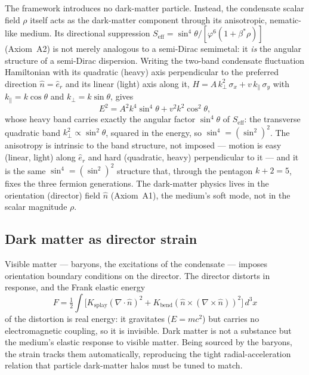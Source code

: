 \documentclass[11pt,a4paper]{article}
\theoremstyle{definition}
\theoremstyle{remark}
\newcommand{\vp}{\varphi}
\newcommand{\bst}{\beta^{*}}
\begin{document}
The framework introduces no dark-matter particle. Instead, the condensate
scalar field $\rho$ itself acts as the dark-matter component through its
anisotropic, nematic-like medium.  Its directional suppression
$S_{\mathrm{eff}}=\sin^4\!\theta/[\vp^6(1+\bst\rho)]$ (Axiom~A2) is not
merely analogous to a semi-Dirac semimetal: it \emph{is} the angular
structure of a semi-Dirac dispersion.  Writing the two-band condensate
fluctuation Hamiltonian with its quadratic (heavy) axis perpendicular to
the preferred direction $\hat{n}=\hat{e}_r$ and its linear (light) axis
along it,
$H=A\,k_\perp^2\,\sigma_x+v\,k_\parallel\,\sigma_y$ with
$k_\parallel=k\cos\theta$ and $k_\perp=k\sin\theta$, gives
\begin{equation}
  E^2 = A^2 k^4\sin^4\!\theta + v^2 k^2\cos^2\!\theta,
  \label{P7:eq:semidirac}
\end{equation}
whose heavy band carries exactly the angular factor $\sin^4\!\theta$ of
$S_{\mathrm{eff}}$: the transverse quadratic band
$k_\perp^2\propto\sin^2\!\theta$, squared in the energy, so
$\sin^4=(\sin^2)^2$.  The anisotropy is intrinsic to the band structure,
not imposed --- motion is easy (linear, light) along $\hat{e}_r$ and hard
(quadratic, heavy) perpendicular to it --- and it is the same
$\sin^4=(\sin^2)^2$ structure that, through the pentagon $k+2=5$, fixes
the three fermion generations.  The dark-matter physics lives in the
orientation (director) field $\hat{n}$ (Axiom~A1), the medium's soft
mode, not in the scalar magnitude $\rho$.

\subsection{Dark matter as director strain}
\label{P7:sec:director_strain}

Visible matter --- baryons, the excitations of the condensate --- imposes
orientation boundary conditions on the director.  The director distorts
in response, and the Frank elastic energy
\begin{equation}
  F=\tfrac12\int\bigl[K_{\mathrm{splay}}(\nabla\!\cdot\hat{n})^2
    +K_{\mathrm{bend}}(\hat{n}\times(\nabla\times\hat{n}))^2\bigr]\,d^3x
  \label{P7:eq:frank}
\end{equation}
of the distortion is real energy: it gravitates ($E=mc^2$) but carries
no electromagnetic coupling, so it is invisible.  Dark matter is not a
substance but the medium's elastic response to visible matter.  Being
sourced by the baryons, the strain tracks them automatically,
reproducing the tight radial-acceleration relation that particle
dark-matter halos must be tuned to match.
\end{document}
